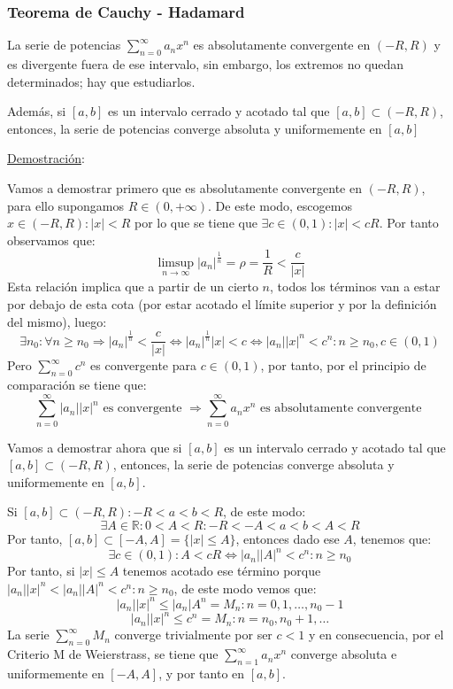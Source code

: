 \documentclass[10pt,a4paper,openright]{book}
\begin{document}
\subsubsection*{Teorema de Cauchy - Hadamard}
La serie de potencias $\sum_{n= 0}^{\infty} a_n x^n$ es absolutamente convergente en $(-R , R)$ y es divergente fuera de ese intervalo, sin embargo, los extremos no quedan determinados; hay que estudiarlos.

Además, si $[a,b]$ es un intervalo cerrado y acotado tal que $[a,b] \subset (-R , R)$, entonces, la serie de potencias converge absoluta y uniformemente en $[a,b]$

\underline{Demostración}:

Vamos a demostrar primero que es absolutamente convergente en $(-R, R)$, para ello supongamos $R \in (0, +\infty)$. De este modo, escogemos $x \in (-R, R) : |x| < R$ por lo que se tiene que $\exists c \in (0,1) : |x| < cR$. Por tanto observamos que:
$$\limsup_{n\rightarrow\infty} |a_n|^{\frac{1}{n}} = \rho = \frac{1}{R} < \frac{c}{|x|}$$
Esta relación implica que a partir de un cierto $n$, todos los términos van a estar por debajo de esta cota (por estar acotado el límite superior y por la definición del mismo), luego:
$$\exists n_0 : \forall n \geq n_0 \Rightarrow |a_n|^{\frac{1}{n}} < \frac{c}{|x|} \Leftrightarrow  |a_n|^{\frac{1}{n}}  |x| < c \Leftrightarrow |a_n| |x|^n < c^n : n \geq n_0 , c \in (0,1)$$
Pero $\sum_{n = 0}^{\infty} c^n$ es convergente para $c \in (0,1)$, por tanto, por el principio de comparación se tiene que:
$$\sum_{n=0}^{\infty} |a_n||x|^n \mbox{ es convergente } \Rightarrow \sum_{n=0}^{\infty} a_n x^n \mbox{ es absolutamente convergente }$$

Vamos a demostrar ahora que si $[a,b]$ es un intervalo cerrado y acotado tal que $[a,b] \subset (-R , R)$, entonces, la serie de potencias converge absoluta y uniformemente en $[a,b]$.

Si $[a,b] \subset (-R , R) : - R < a < b < R$, de este modo:
$$\exists A \in \mathbb R: 0 < A < R : - R < - A < a < b < A < R $$
Por tanto, $[a,b] \subset [-A, A] = \{|x| \leq A\}$, entonces dado ese $A$, tenemos que:
$$\exists c \in (0,1) : A < cR \Leftrightarrow |a_n| |A|^n < c^n : n \geq n_0$$
Por tanto, si $|x| \leq A$ tenemos acotado ese término porque $|a_n| |x|^n  < |a_n| |A|^n  < c^n : n \geq n_0$, de este modo vemos que:
$$|a_n||x|^n \leq |a_n| A^n = M_n : n = 0,1, \ldots, n_0 - 1$$
$$|a_n||x|^n \leq c^n = M_n : n = n_0, n_0 + 1, \ldots$$
La serie $\sum_{n=0}^{\infty} M_n$ converge trivialmente por ser $c < 1$ y en consecuencia, por el Criterio M de Weierstrass, se tiene que $\sum_{n=1}^{\infty} a_n x^n$ converge absoluta e uniformemente en $[-A, A]$, y por tanto en $[a,b]$.
\end{document}
